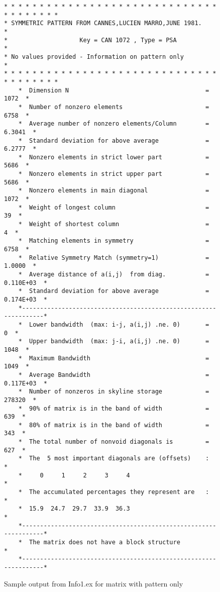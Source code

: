 \begin{figure}
\begin{verbatim}
* * * * * * * * * * * * * * * * * * * * * * * * * * * * * * * * * * * * * *
* SYMMETRIC PATTERN FROM CANNES,LUCIEN MARRO,JUNE 1981.                   *
*                    Key = CAN 1072 , Type = PSA                          *
* No values provided - Information on pattern only                        *
* * * * * * * * * * * * * * * * * * * * * * * * * * * * * * * * * * * * * *
    *  Dimension N                                      =       1072  *
    *  Number of nonzero elements                       =       6758  *
    *  Average number of nonzero elements/Column        =     6.3041  *
    *  Standard deviation for above average             =     6.2777  *
    *  Nonzero elements in strict lower part            =       5686  *
    *  Nonzero elements in strict upper part            =       5686  *
    *  Nonzero elements in main diagonal                =       1072  *
    *  Weight of longest column                         =         39  *
    *  Weight of shortest column                        =          4  *
    *  Matching elements in symmetry                    =       6758  *
    *  Relative Symmetry Match (symmetry=1)             =     1.0000  *
    *  Average distance of a(i,j)  from diag.           =  0.110E+03  *
    *  Standard deviation for above average             =  0.174E+03  *
    *-----------------------------------------------------------------*
    *  Lower bandwidth  (max: i-j, a(i,j) .ne. 0)       =          0  *
    *  Upper bandwidth  (max: j-i, a(i,j) .ne. 0)       =       1048  *
    *  Maximum Bandwidth                                =       1049  *
    *  Average Bandwidth                                =  0.117E+03  *
    *  Number of nonzeros in skyline storage            =     278320  *
    *  90% of matrix is in the band of width            =        639  *
    *  80% of matrix is in the band of width            =        343  *
    *  The total number of nonvoid diagonals is         =        627  *
    *  The  5 most important diagonals are (offsets)    :             *
    *     0     1     2     3     4                                   *
    *  The accumulated percentages they represent are   :             *
    *  15.9  24.7  29.7  33.9  36.3                                   *
    *-----------------------------------------------------------------*
    *  The matrix does not have a block structure                     *
    *-----------------------------------------------------------------*
\end{verbatim}
\caption{Sample output from Info1.ex for matrix with pattern only \label{Fig2}}
\end{figure}


